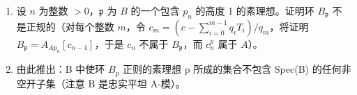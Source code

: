 \begin{enumerate}
\def\labelenumi{\alph{enumi})}
\item
  设 \(n\) 为整数 \(> 0\)，\(\mathfrak{p}\) 为 \(B\) 的一个包含 \(p_n\) 的高度 1 的素理想。证明环 \(B_{\mathfrak{p}}\) 不是正规的（对每个整数 \(m\)，令 \(c_m = (c - \sum_{i=0}^{m-1} q_i T_i)/q_m\)，将证明 \(B_{\mathfrak{p}} = A_{A p_n}[c_{n-1}]\)，于是 \(c_n\) 不属于 \(B_{\mathfrak{p}}\)，而 \(c_n^p\) 属于 \(A\)）。
\item
  由此推出：B 中使环 \(B_{p}\) 正则的素理想 p 所成的集合不包含 Spec(B) 的任何非空开子集（注意 B 是忠实平坦 A-模）。
\end{enumerate}

